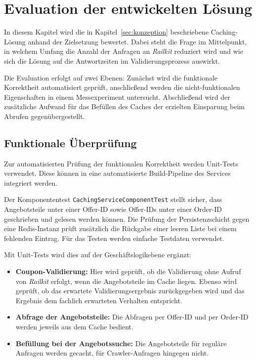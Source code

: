 \section{Evaluation der entwickelten Lösung}
\label{sec:evaluation}

In diesem Kapitel wird die in Kapitel~\ref{sec:konzeption} beschriebene Caching-Lösung anhand der Zielsetzung bewertet. Dabei steht die Frage im Mittelpunkt, in welchem Umfang die Anzahl der Anfragen an \textit{Railkit} reduziert wird und wie sich die Lösung auf die Antwortzeiten im Validierungsprozess auswirkt.

Die Evaluation erfolgt auf zwei Ebenen: Zunächst wird die funktionale Korrektheit automatisiert geprüft, anschließend werden die nicht-funktionalen Eigenschaften in einem Messexperiment untersucht. Abschließend wird der zusätzliche Aufwand für das Befüllen des Caches der erzielten Einsparung beim Abrufen gegenübergestellt.

\subsection{Funktionale Überprüfung}
\label{subsec:tests}

Zur automatisierten Prüfung der funktionalen Korrektheit werden Unit-Tests verwendet. Diese können in eine automatisierte Build-Pipeline des Services integriert werden.

Der Komponententest \texttt{CachingServiceComponentTest} stellt sicher, dass Angebotsteile unter einer Offer-ID sowie Offer-IDs unter einer Order-ID geschrieben und gelesen werden können. Die Prüfung der Persistenzschicht gegen eine Redis-Instanz prüft zusätzlich die Rückgabe einer leeren Liste bei einem fehlenden Eintrag. Für das Testen werden einfache Testdaten verwendet.

Mit Unit-Tests wird dies auf der Geschäftslogikebene ergänzt:

\begin{itemize}
    \item \textbf{Coupon-Validierung:} Hier wird geprüft, ob die Validierung ohne Aufruf von \textit{Railkit} erfolgt, wenn die Angebotsteile im Cache liegen. Ebenso wird geprüft, ob das erwartete Validierungsergebnis zurückgegeben wird und das Ergebnis dem fachlich erwarteten Verhalten entspricht.
    \item \textbf{Abfrage der Angebotsteile:} Die Abfragen per Offer-ID und per Order-ID werden jeweils aus dem Cache bedient.
    \item \textbf{Befüllung bei der Angebotssuche:} Die Angebotsteile für reguläre Anfragen werden gecacht, für Crawler-Anfragen hingegen nicht.
\end{itemize}

